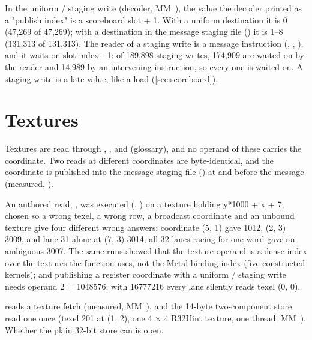 In the uniform / staging write (decoder, MM~), the value the decoder printed as a
"publish index" is a scoreboard slot + 1. With a uniform destination it is 0 (47,269 of 47,269); with a destination in the message staging file
() it is 1--8 (131,313 of 131,313). The reader of a staging write is a message instruction (, , ), and it waits on slot index - 1: of 189,898 staging writes,
174,909 are waited on by the reader and 14,989 by an intervening instruction, so every one is waited on. A staging write is a
late value, like a load (\cref{sec:scoreboard}).

\section{Textures}\label{sec:textures}

Textures are read through , ,  and  (glossary), and no operand of these carries the coordinate. Two reads at different coordinates are byte-identical, and the
coordinate is published into the message staging file () at \code{[op4+0*4]} and \code{[op4+2*4]} before the message (measured,
).

An authored read, , was executed (,
) on a texture holding y*1000 + x + 7, chosen so a wrong texel, a wrong row, a broadcast coordinate and an unbound texture
give four different wrong answers: coordinate (5, 1) gave 1012, (2, 3) 3009, and lane 31 alone at (7, 3) 3014; all 32
lanes racing for one word gave an ambiguous 3007. The same runs showed that the texture operand is a dense index over
the textures the function uses, not the Metal binding index (five constructed kernels); and publishing a register
coordinate with a uniform / staging write needs operand 2 = 1048576; with 16777216 every lane silently reads texel (0, 0).

 reads a texture fetch (measured,
MM~), and the 14-byte two-component store  read one once (texel 201 at (1, 2), one 4 $\times$ 4 R32Uint texture, one
thread; MM~). Whether the plain 32-bit store  can is open.

